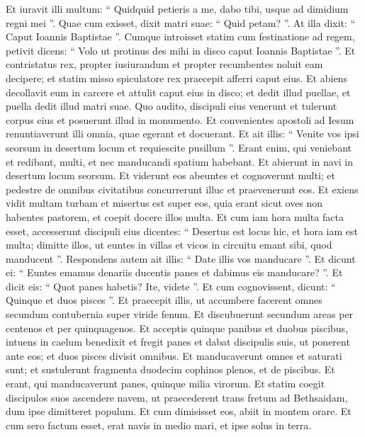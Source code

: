 \begin{biblechapter}
\begin{biblechapter}
\begin{biblechapter}
\begin{biblechapter}
\begin{biblechapter}
\begin{biblechapter}
\verse Et iuravit illi multum: “ Quidquid petieris a me, dabo tibi, usque ad dimidium regni mei ”. 
\verse Quae cum exisset, dixit matri suae: “ Quid petam? ”. At illa dixit: “ Caput Ioannis Baptistae ”. 
\verse Cumque introisset statim cum festinatione ad regem, petivit dicens: “ Volo ut protinus des mihi in disco caput Ioannis Baptistae ”. 
\verse Et contristatus rex, propter iusiurandum et propter recumbentes noluit eam decipere; 
\verse et statim misso spiculatore rex praecepit afferri caput eius. Et abiens decollavit eum in carcere 
\verse et attulit caput eius in disco; et dedit illud puellae, et puella dedit illud matri suae. 
\verse Quo audito, discipuli eius venerunt et tulerunt corpus eius et posuerunt illud in monumento.
 \verse Et convenientes apostoli ad Iesum renuntiaverunt illi omnia, quae egerant et docuerant. 
\verse Et ait illis: “ Venite vos ipsi seorsum in desertum locum et requiescite pusillum ”. Erant enim, qui veniebant et redibant, multi, et nec manducandi spatium habebant. 
\verse Et abierunt in navi in desertum locum seorsum.
 \verse Et viderunt eos abeuntes et cognoverunt multi; et pedestre de omnibus civitatibus concurrerunt illuc et praevenerunt eos. 
\verse Et exiens vidit multam turbam et misertus est super eos, quia erant sicut oves non habentes pastorem, et coepit docere illos multa. 
\verse Et cum iam hora multa facta esset, accesserunt discipuli eius dicentes: “ Desertus est locus hic, et hora iam est multa; 
\verse dimitte illos, ut euntes in villas et vicos in circuitu emant sibi, quod manducent ”. 
\verse Respondens autem ait illis: “ Date illis vos manducare ”. Et dicunt ei: “ Euntes emamus denariis ducentis panes et dabimus eis manducare? ”. 
\verse Et dicit eis: “ Quot panes habetis? Ite, videte ”. Et cum cognovissent, dicunt: “ Quinque et duos pisces ”. 
\verse Et praecepit illis, ut accumbere facerent omnes secundum contubernia super viride fenum. 
 \verse Et discubuerunt secundum areas per centenos et per quinquagenos. 
\verse Et acceptis quinque panibus et duobus piscibus, intuens in caelum benedixit et fregit panes et dabat discipulis suis, ut ponerent ante eos; et duos pisces divisit omnibus. 
\verse Et manducaverunt omnes et saturati sunt; 
\verse et sustulerunt fragmenta duodecim cophinos plenos, et de piscibus. 
\verse Et erant, qui manducaverunt panes, quinque milia virorum.
 \verse Et statim coegit discipulos suos ascendere navem, ut praecederent trans fretum ad Bethsaidam, dum ipse dimitteret populum. 
\verse Et cum dimisisset eos, abiit in montem orare. 
\verse Et cum sero factum esset, erat navis in medio mari, et ipse solus in terra. 

\end{biblechapter}
\end{biblechapter}
\end{biblechapter}
\end{biblechapter}
\end{biblechapter}
\end{biblechapter}
